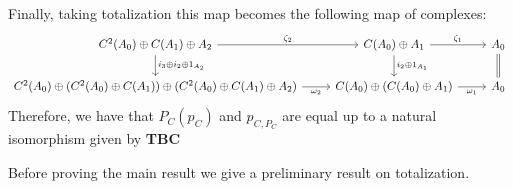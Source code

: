 Finally, taking totalization this map becomes the following map of complexes:
\[\begin{tikzcd}
	{C^2(A_0)\oplus C(A_1)\oplus A_2} & {C(A_0)\oplus A_1} & {A_0} \\
	{C^2(A_0)\oplus (C^2(A_0)\oplus C(A_1))\oplus (C^2(A_0)\oplus C(A_1)\oplus A_2)} & {C(A_0)\oplus (C(A_0)\oplus A_1)} & {A_0}
	\arrow[Rightarrow, no head, from=1-3, to=2-3]
	\arrow["{\zeta_1}", from=1-2, to=1-3]
	\arrow["{\omega_1}"', from=2-2, to=2-3]
	\arrow["{i_2\oplus 1_{A_1}}", from=1-2, to=2-2]
	\arrow["{\omega_2}"', from=2-1, to=2-2]
	\arrow["{\zeta_2}", from=1-1, to=1-2]
	\arrow["{i_3\oplus i_2\oplus 1_{A_2}}", from=1-1, to=2-1]
\end{tikzcd}\]
Therefore, we have that $P_C(p_C)$ and $p_{C,P_C}$ are equal up to a natural isomorphism given by \textbf{TBC} 



Before proving the main result we give a preliminary result on totalization.


